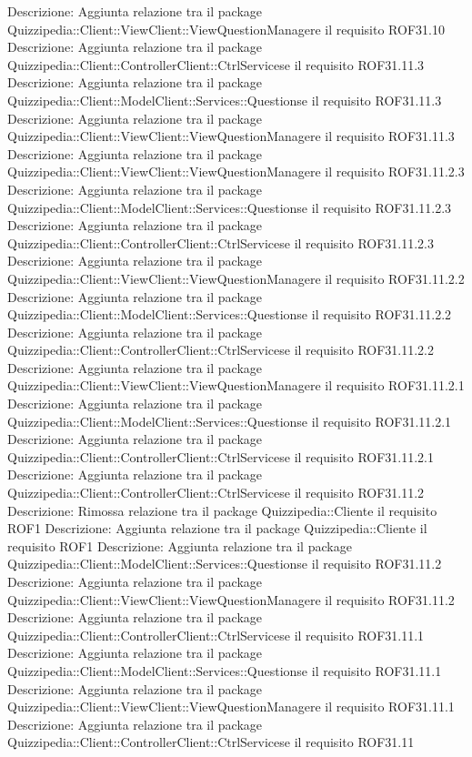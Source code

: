 Descrizione: Aggiunta relazione tra il package Quizzipedia::Client::ViewClient::ViewQuestionManagere il requisito ROF31.10 
Descrizione: Aggiunta relazione tra il package Quizzipedia::Client::ControllerClient::CtrlServicese il requisito ROF31.11.3 
Descrizione: Aggiunta relazione tra il package Quizzipedia::Client::ModelClient::Services::Questionse il requisito ROF31.11.3 
Descrizione: Aggiunta relazione tra il package Quizzipedia::Client::ViewClient::ViewQuestionManagere il requisito ROF31.11.3 
Descrizione: Aggiunta relazione tra il package Quizzipedia::Client::ViewClient::ViewQuestionManagere il requisito ROF31.11.2.3 
Descrizione: Aggiunta relazione tra il package Quizzipedia::Client::ModelClient::Services::Questionse il requisito ROF31.11.2.3 
Descrizione: Aggiunta relazione tra il package Quizzipedia::Client::ControllerClient::CtrlServicese il requisito ROF31.11.2.3 
Descrizione: Aggiunta relazione tra il package Quizzipedia::Client::ViewClient::ViewQuestionManagere il requisito ROF31.11.2.2 
Descrizione: Aggiunta relazione tra il package Quizzipedia::Client::ModelClient::Services::Questionse il requisito ROF31.11.2.2 
Descrizione: Aggiunta relazione tra il package Quizzipedia::Client::ControllerClient::CtrlServicese il requisito ROF31.11.2.2 
Descrizione: Aggiunta relazione tra il package Quizzipedia::Client::ViewClient::ViewQuestionManagere il requisito ROF31.11.2.1 
Descrizione: Aggiunta relazione tra il package Quizzipedia::Client::ModelClient::Services::Questionse il requisito ROF31.11.2.1 
Descrizione: Aggiunta relazione tra il package Quizzipedia::Client::ControllerClient::CtrlServicese il requisito ROF31.11.2.1 
Descrizione: Aggiunta relazione tra il package Quizzipedia::Client::ControllerClient::CtrlServicese il requisito ROF31.11.2 
Descrizione: Rimossa relazione tra il package Quizzipedia::Cliente il requisito ROF1 
Descrizione: Aggiunta relazione tra il package Quizzipedia::Cliente il requisito ROF1 
Descrizione: Aggiunta relazione tra il package Quizzipedia::Client::ModelClient::Services::Questionse il requisito ROF31.11.2 
Descrizione: Aggiunta relazione tra il package Quizzipedia::Client::ViewClient::ViewQuestionManagere il requisito ROF31.11.2 
Descrizione: Aggiunta relazione tra il package Quizzipedia::Client::ControllerClient::CtrlServicese il requisito ROF31.11.1 
Descrizione: Aggiunta relazione tra il package Quizzipedia::Client::ModelClient::Services::Questionse il requisito ROF31.11.1 
Descrizione: Aggiunta relazione tra il package Quizzipedia::Client::ViewClient::ViewQuestionManagere il requisito ROF31.11.1 
Descrizione: Aggiunta relazione tra il package Quizzipedia::Client::ControllerClient::CtrlServicese il requisito ROF31.11 
